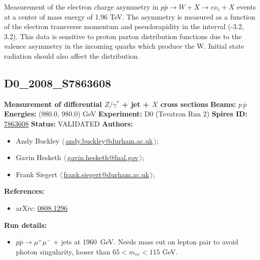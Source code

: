 \noindent Measurement of the electron charge asymmetry in $p \bar p \to W + X \to e \nu_e + X$ events at a center of mass energy of 1.96 TeV. The asymmetry is measured as a function of the electron transverse momentum and pseudorapidity in the interval (-3.2, 3.2).  This data is sensitive to proton parton distribution functions due to the valence asymmetry in the incoming quarks which produce the W. Initial state radiation should also affect the \pT distribution.

\clearpage


\clearpage

\subsection[D0\_2008\_S7863608]{D0\_2008\_S7863608\,\cite{Abazov:2008ez}}
\textbf{Measurement of differential $Z/\gamma^*$ + jet + $X$ cross sections}\newline
\textbf{Beams:} $p$\,$\bar{p}$ \newline
\textbf{Energies:} (980.0, 980.0) GeV \newline
\textbf{Experiment:} D0 (Tevatron Run 2) \newline
\textbf{Spires ID:} \href{http://www.slac.stanford.edu/spires/find/hep/www?rawcmd=key+7863608}{7863608}\newline
\textbf{Status:} VALIDATED\newline
\textbf{Authors:}
\begin{itemize}
  \item Andy Buckley $\langle\,$\href{mailto:andy.buckley@durham.ac.uk}{andy.buckley@durham.ac.uk}$\,\rangle$;
  \item Gavin Hesketh $\langle\,$\href{mailto:gavin.hesketh@fnal.gov}{gavin.hesketh@fnal.gov}$\,\rangle$;
  \item Frank Siegert $\langle\,$\href{mailto:frank.siegert@durham.ac.uk}{frank.siegert@durham.ac.uk}$\,\rangle$;
\end{itemize}
\textbf{References:}
\begin{itemize}
  \item arXiv: \href{http://arxiv.org/abs/0808.1296}{0808.1296}
\end{itemize}
\textbf{Run details:}
\begin{itemize}

  \item $p \bar{p} \to \mu^+ \mu^-$ + jets at 1960~GeV. Needs mass cut on lepton pair to avoid photon singularity, looser than $65 < m_{ee} < 115$ GeV.\end{itemize}

